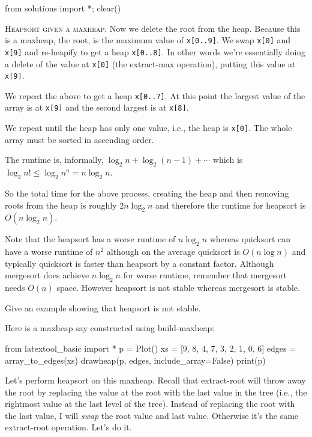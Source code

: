 
\begin{python0}
from solutions import *; clear()
\end{python0}

\textsc{Heapsort given a maxheap.}
Now we delete the root from the heap.
Because this is a maxheap, the root, is the 
maximum value of \verb!x[0..9]!.
We swap \verb!x[0]! and \verb!x[9]!
and re-heapify to get a heap \verb!x[0..8]!.
In other words we're essentially doing a delete of the value at \verb!x[0]!
(the extract-max operation), putting this value at \texttt{x[9]}.

We repeat the above to get a heap \verb!x[0..7]!.
At this point the largest value of the array is at \verb!x[9]!
and the second largest is at \verb!x[8]!.

We repeat until the heap has only one value, i.e., the heap is \verb!x[0]!.
The whole array must be sorted in ascending order.

The runtime is, informally, $\log_2 n + \log_2 (n - 1) + \cdots$
which is $\log_2 n! \leq \log_2 n^n = n \log_2 n$.

So the total time for the above process,
creating the heap and then removing roots from the 
heap is roughly $2 n \log_2 n$ and therefore
the runtime for heapsort is $O(n \log_2 n)$.

Note that the heapsort has a worse runtime of $n \log_2 n$
whereas quicksort can have a worse runtime of $n^2$
although
on the average quicksort is $O(n \log n)$ and 
typically quicksort is faster than heapsort by a constant
factor.
Although mergesort does achieve $n \log_2 n$ for worse runtime,
remember that mergesort needs $O(n)$ space.
However heapsort is not stable whereas mergesort is stable.

\begin{ex}
  Give an example showing that heapsort is not
  stable.
\end{ex}
  
  

\newpage
Here is a maxheap say constructed
using build-maxheap:

\begin{python}
from latextool_basic import *
p = Plot()
xs = [9, 8, 4, 7, 3, 2, 1, 0, 6]
edges = array_to_edges(xs)
drawheap(p, edges, include_array=False)
print(p)
\end{python}

Let's perform heapsort on this maxheap.
Recall that extract-root will throw away the root by replacing
the value at the root with the last value in the tree (i.e.,
the rightmost value at the last level of the tree).
Instead of replacing the root with the last value,
I will \textit{swap} the root value and last value.
Otherwise it's the same extract-root operation.
Let's do it.


